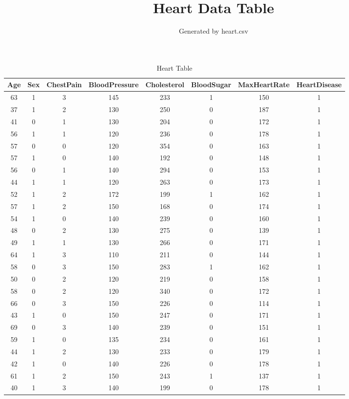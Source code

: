 \documentclass{article}
\title{Heart Data Table}
\author{Generated by heart.csv}
\begin{document}
\maketitle
\begin{longtable}{|c|c|c|c|c|c|c|c|}
\caption{Heart Table} \\
\hline
Age & Sex & ChestPain & BloodPressure & Cholesterol & BloodSugar & MaxHeartRate & HeartDisease \\ \hline
63 & 1 & 3 & 145 & 233 & 1 & 150 & 1 \\ \hline
37 & 1 & 2 & 130 & 250 & 0 & 187 & 1 \\ \hline
41 & 0 & 1 & 130 & 204 & 0 & 172 & 1 \\ \hline
56 & 1 & 1 & 120 & 236 & 0 & 178 & 1 \\ \hline
57 & 0 & 0 & 120 & 354 & 0 & 163 & 1 \\ \hline
57 & 1 & 0 & 140 & 192 & 0 & 148 & 1 \\ \hline
56 & 0 & 1 & 140 & 294 & 0 & 153 & 1 \\ \hline
44 & 1 & 1 & 120 & 263 & 0 & 173 & 1 \\ \hline
52 & 1 & 2 & 172 & 199 & 1 & 162 & 1 \\ \hline
57 & 1 & 2 & 150 & 168 & 0 & 174 & 1 \\ \hline
54 & 1 & 0 & 140 & 239 & 0 & 160 & 1 \\ \hline
48 & 0 & 2 & 130 & 275 & 0 & 139 & 1 \\ \hline
49 & 1 & 1 & 130 & 266 & 0 & 171 & 1 \\ \hline
64 & 1 & 3 & 110 & 211 & 0 & 144 & 1 \\ \hline
58 & 0 & 3 & 150 & 283 & 1 & 162 & 1 \\ \hline
50 & 0 & 2 & 120 & 219 & 0 & 158 & 1 \\ \hline
58 & 0 & 2 & 120 & 340 & 0 & 172 & 1 \\ \hline
66 & 0 & 3 & 150 & 226 & 0 & 114 & 1 \\ \hline
43 & 1 & 0 & 150 & 247 & 0 & 171 & 1 \\ \hline
69 & 0 & 3 & 140 & 239 & 0 & 151 & 1 \\ \hline
59 & 1 & 0 & 135 & 234 & 0 & 161 & 1 \\ \hline
44 & 1 & 2 & 130 & 233 & 0 & 179 & 1 \\ \hline
42 & 1 & 0 & 140 & 226 & 0 & 178 & 1 \\ \hline
61 & 1 & 2 & 150 & 243 & 1 & 137 & 1 \\ \hline
40 & 1 & 3 & 140 & 199 & 0 & 178 & 1 \\ \hline

\end{longtable}
\end{document}
